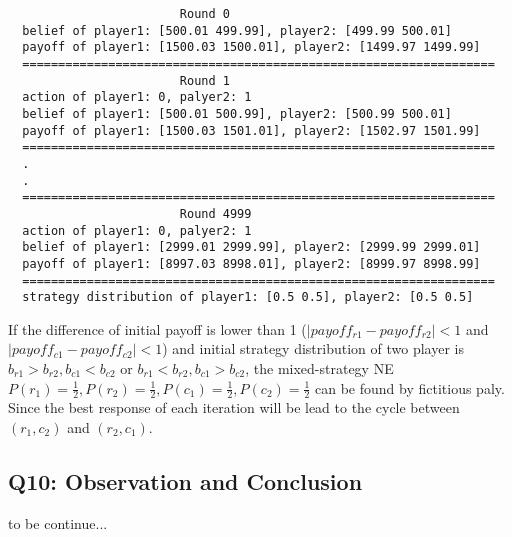 \documentclass[a4paper, oneside, final, 12pt]{scrartcl} %
\begin{document}
\begin{lstlisting}
                        Round 0
  belief of player1: [500.01 499.99], player2: [499.99 500.01]
  payoff of player1: [1500.03 1500.01], player2: [1499.97 1499.99]
  ==================================================================
                        Round 1
  action of player1: 0, palyer2: 1
  belief of player1: [500.01 500.99], player2: [500.99 500.01]
  payoff of player1: [1500.03 1501.01], player2: [1502.97 1501.99]
  ==================================================================
  .
  .
  ==================================================================
                        Round 4999
  action of player1: 0, palyer2: 1
  belief of player1: [2999.01 2999.99], player2: [2999.99 2999.01]
  payoff of player1: [8997.03 8998.01], player2: [8999.97 8998.99]
  ==================================================================
  strategy distribution of player1: [0.5 0.5], player2: [0.5 0.5]
\end{lstlisting}

\begingroup
\raggedright
If the difference of initial payoff is lower than 1
($|payoff_{r1} - payoff_{r2}| < 1$ and $|payoff_{c1} - payoff_{c2}| < 1$)
and initial strategy distribution of two player is 
$b_{r1} > b_{r2}, b_{c1} < b_{c2}$  or  $b_{r1} < b_{r2}, b_{c1} > b_{c2}$, 
the mixed-strategy NE $P(r_1) = \frac{1}{2}, P(r_2) = \frac{1}{2}, 
P(c_1) = \frac{1}{2}, P(c_2) = \frac{1}{2}$ can be found by fictitious paly.
Since the best response of each iteration will be lead to the cycle 
between $(r_1, c_2)$ and $(r_2, c_1)$.
\endgroup

\subsection{Q10: Observation and Conclusion}

to be continue...


\end{document}
